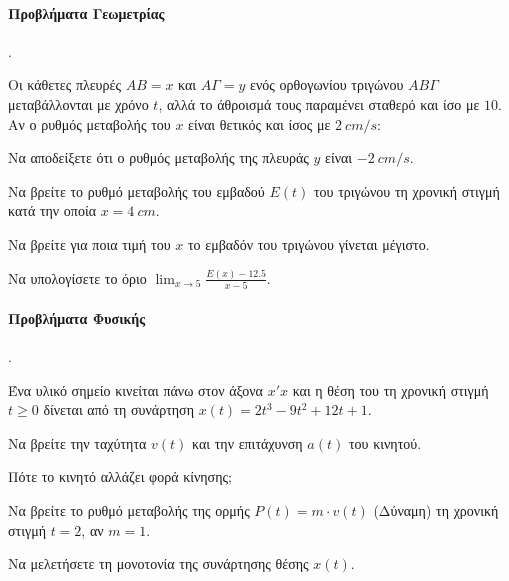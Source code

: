 \documentclass[11pt,a4paper,twocolumn]{article}
\newcounter{askhsh}
\newcommand{\askhsh}{\large\theaskhsh.\ \addtocounter{askhsh}{1}}
\begin{document}
\paragraph{Προβλήματα Γεωμετρίας}
\askhsh Οι κάθετες πλευρές $AB=x$ και $A\Gamma=y$ ενός ορθογωνίου τριγώνου $AB\Gamma$ μεταβάλλονται με χρόνο $t$, αλλά το άθροισμά τους παραμένει σταθερό και ίσο με $10$. Αν ο ρυθμός μεταβολής του $x$ είναι θετικός και ίσος με $2\ cm/s$:
\begin{alist}
\item Να αποδείξετε ότι ο ρυθμός μεταβολής της πλευράς $y$ είναι $-2\ cm/s$.
\item Να βρείτε το ρυθμό μεταβολής του εμβαδού $E(t)$ του τριγώνου τη χρονική στιγμή κατά την οποία $x=4\ cm$.
\item Να βρείτε για ποια τιμή του $x$ το εμβαδόν του τριγώνου γίνεται μέγιστο.
\item Να υπολογίσετε το όριο $\lim_{x\to 5} \frac{E(x)-12.5}{x-5}$.
\end{alist}
\begin{center}
\end{center}

\paragraph{Προβλήματα Φυσικής}
\askhsh Ένα υλικό σημείο κινείται πάνω στον άξονα $x'x$ και η θέση του τη χρονική στιγμή $t\ge 0$ δίνεται από τη συνάρτηση $x(t) = 2t^3 - 9t^2 + 12t + 1$.
\begin{alist}
\item Να βρείτε την ταχύτητα $v(t)$ και την επιτάχυνση $a(t)$ του κινητού.
\item Πότε το κινητό αλλάζει φορά κίνησης;
\item Να βρείτε το ρυθμό μεταβολής της ορμής $P(t) = m\cdot v(t)$ (Δύναμη) τη χρονική στιγμή $t=2$, αν $m=1$.
\item Να μελετήσετε τη μονοτονία της συνάρτησης θέσης $x(t)$.
\end{alist}

\begin{center}
\end{center}
\end{document}
